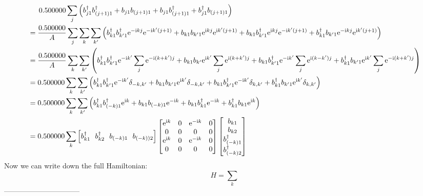\documentclass[letter]{article}
\newcommand{\e}{\mathrm{e}}
\newcommand{\ii}{\mathrm{i}}
\begin{document}
  $$
\begin{aligned}
  & \indent  0.500000\sum_{j}\left(b_{j1}^{\dagger}b_{(j+1)1}^{\dagger}+b_{j1}b_{(j+1)1}+b_{j1}b_{(j+1)1}^{\dagger}+b_{j1}^{\dagger}b_{(j+1)1}\right)\\
  &=\frac{0.500000}{A}\sum_{j}\sum_{k}\sum_{k'}\left(b_{k1}^{\dagger}b_{k'1}^{\dagger}\e^{-\ii kj}\e^{-\ii k'(j+1)}+b_{k1}b_{k'1}\e^{\ii kj}\e^{\ii k'(j+1)}+b_{k1}b_{k'1}^{\dagger}\e^{\ii kj}\e^{-\ii k'(j+1)}+b_{k1}^{\dagger}b_{k'1}\e^{-\ii kj}\e^{\ii k'(j+1)}\right)\\
  &=\frac{0.500000}{A}\sum_{k}\sum_{k'}\left(b_{k1}^{\dagger}b_{k'1}^{\dagger}\e^{-\ii k'}\sum_j \e^{-\ii (k+k')j}+b_{k1}b_{k'}\e^{\ii k'}\sum_j \e^{\ii (k+k')j}+b_{k1}b_{k'1}^{\dagger}\e^{-\ii k'}\sum_j \e^{\ii (k-k')j}+b_{k1}^{\dagger}b_{k'1}\e^{\ii k'}\sum_j \e^{-\ii (k+k')j}\right)\\
  &=0.500000\sum_k\sum_{k'}\left(b_{k1}^{\dagger}b_{k'1}^{\dagger}\e^{-\ii k'}\delta_{-k,k'}+b_{k1}b_{k'1}\e^{\ii k'}\delta_{-k,k'}+b_{k1}b_{k'1}^{\dagger}\e^{-\ii k'}\delta_{k,k'}+b_{k1}^{\dagger}b_{k'1}\e^{\ii k'}\delta_{k,k'}\right)\\
  &=0.500000\sum_k\sum_{k'}\left(b_{k1}^{\dagger}b_{(-k)1}^{\dagger}\e^{\ii k}+b_{k1}b_{(-k)1}\e^{-\ii k}+b_{k1}b_{k1}^{\dagger}\e^{-\ii k}+b_{k1}^{\dagger}b_{k1}\e^{\ii k}\right)\\
  &=0.500000\sum_k \left[
    b_{k1}^{\dagger} \ \ 
    b_{k2}^{\dagger}\  \ 
    b_{(-k)1}\ \ 
    b_{(-k))2}\right]
   \begin{bmatrix}
        \e^{\ii k} & 0 & \e^{-\ii k} & 0 \\
       0 &  0 & 0 &0 \\
       \e^{\ii k} &  0 & \e^{-\ii k} &0\\
        0 & 0 & 0& 0
        \end{bmatrix}\begin{bmatrix}
            b_{k1}  \\
            b_{k2}  \\
            b_{(-k)1}^{\dagger}\\
            b_{(-k)2}^{\dagger}
            \end{bmatrix}
\end{aligned}
$$
Now we can write down the full Hamiltonian:
$$H=\sum_{k}$$
--------------------------------\\
\end{document}
